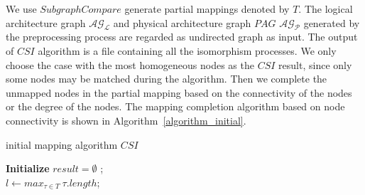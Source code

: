 \documentclass[runningheads]{llncs}
\begin{document}
We use $SubgraphCompare$ generate partial mappings denoted by $T$. 
The logical architecture graph  $\mathcal{AG_{L}}$ 
and physical architecture graph $PAG$ $\mathcal{AG_{P}}$ generated by the preprocessing process 
are regarded as undirected graph as input.
The output of $CSI$ algorithm is a file containing all the isomorphism processes. 
We only choose the case with the most homogeneous nodes as the $CSI$ result, 
since only some nodes may be matched during the algorithm.
Then we complete the unmapped nodes in the partial mapping based on the connectivity of 
the nodes or the degree of the nodes. 
The mapping completion algorithm based on node connectivity is shown in Algorithm~\ref{algorithm_initial}.
\begin{algorithm}  
	\label{algorithm_initial}
	\caption{initial mapping algorithm $CSI$}  
	\LinesNumbered  
	\textbf{Initialize} $result=\emptyset$ ;\\
	$l \leftarrow max_{\tau \in T} \  \tau.length$; \\
	\end{algorithm}
	
\end{document}
